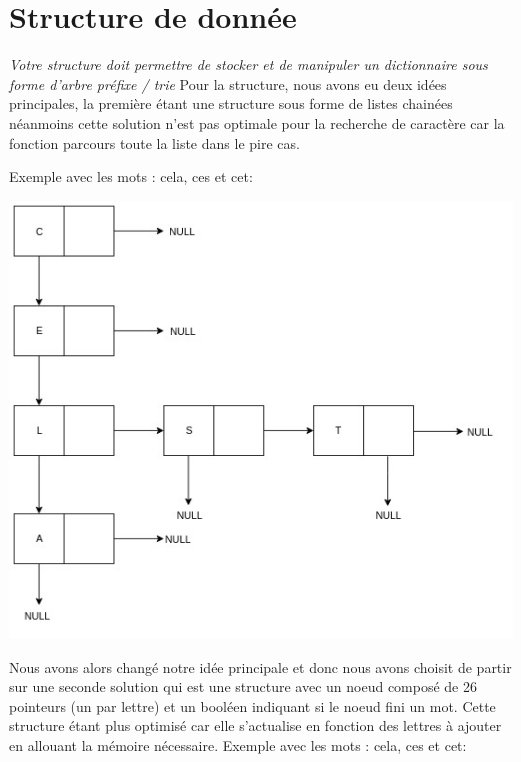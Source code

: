 \documentclass[12pt]{article}
\begin{document}
\section{Structure de donnée}
	

\textit{Votre structure doit permettre de stocker et de manipuler un dictionnaire sous forme d'arbre préfixe / trie}
\newline
\newline
Pour la structure, nous avons eu deux idées principales, la première étant une structure sous forme de listes chainées néanmoins cette solution n'est pas optimale pour la recherche de caractère car la fonction parcours toute la liste dans le pire cas.

\newline
\noindent
Exemple avec les mots : cela, ces et cet:
\newline

\includegraphics[scale=0.7]{structure1.jpeg}

\newpage

\newline
\noindent
Nous avons alors changé notre idée principale et donc nous avons choisit de partir sur une seconde solution qui est une structure avec un noeud composé de 26 pointeurs (un par lettre) et un booléen indiquant si le noeud fini un mot. Cette structure étant plus optimisé car elle s'actualise en fonction des lettres à ajouter en allouant la mémoire nécessaire.
\newline
\noindent
Exemple avec les mots : cela, ces et cet:
\newline
\end{document}
